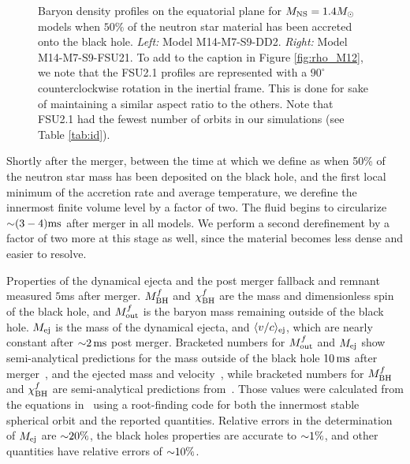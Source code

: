 \begin{figure}
\begin{subfigure}[b]{0.475\textwidth}
		\label{fig:rho_M14_FSU21}
		\centering
	\end{subfigure}
	\caption[Density profiles on equatorial plane for $1.4 M_{\odot}$ models]{
	Baryon density profiles on the equatorial plane for $M_{\rm NS} = 1.4 M_{\odot}$ models when $50\%$ of the neutron star material has been accreted onto the black hole.
	\textit{Left:} Model M14-M7-S9-DD2.
	\textit{Right:} Model M14-M7-S9-FSU21.
	To add to the caption in Figure \ref{fig:rho_M12}, we note that the FSU2.1 profiles are represented with a $90^{\circ}$ counterclockwise rotation in the inertial frame.  This is done for sake of maintaining a similar aspect ratio to the others.  Note that FSU2.1 had the fewest number of orbits in our simulations (see Table \ref{tab:id}). 
	}
	\label{fig:rho_M14}
\end{figure}

Shortly after the merger, between the time at which we define as when 50\% of the neutron star mass has been deposited on the black hole, and the first local minimum of the accretion rate and average temperature, we derefine the innermost finite volume level by a factor of two.
The fluid begins to circularize $\mathord{\sim} (3-4) {\rm ms}$ after merger in all models.
We perform a second derefinement by a factor of two more at 
this stage as well, since the material becomes less dense and easier to resolve.



\begin{table}
	\begin{center}
		\caption[Properties of the dynamical ejecta and post merger remnant]{
			Properties of the dynamical ejecta and the post merger fallback and remnant measured $5$ms after merger. 
			$M_{\rm BH}^f$ and  $\chi_{\rm BH}^f$  are the mass and dimensionless spin of the black hole,
			and $M_{\rm out}^f$ is the baryon mass remaining outside of the black hole.
			$M_{\rm ej}$ is the mass of the dynamical ejecta, and $\langle v/c\rangle_{\rm ej}$, which are nearly constant after $\mathord{\sim} 2\,{\rm ms}$ post merger. 
			Bracketed numbers for
			$M_{\rm out}^f$ and $M_{\rm ej}$ show semi-analytical predictions for the mass outside of the black hole $10\,{\rm ms}$ after merger~\cite{Foucart2012},
			and the ejected mass and velocity~\cite{Kawaguchi:2016}, while bracketed numbers for $M_{\rm BH}^f$ and $\chi_{\rm BH}^f$ are semi-analytical predictions
			from~\cite{pannarale2013black,Pannarale:2014}. Those values were calculated from the equations in~\cite{Pannarale:2014} using a root-finding code for both the innermost stable spherical orbit and the reported quantities.  Relative errors in the determination of $M_{\rm ej}$ are $\mathord{\sim} 20\%$, the black holes properties are
			accurate to $\mathord{\sim} 1\%$, and other quantities have relative errors of $\mathord{\sim} 10\%$.
		}
		\label{tab:results}
		{
			
		}
	\end{center}
\end{table}



